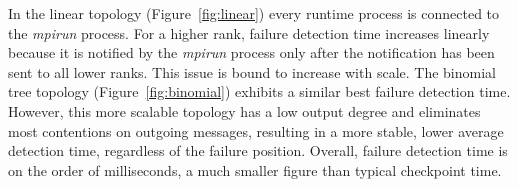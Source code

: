 In the linear topology (Figure~\ref{fig:linear}) every runtime process
is connected to the \emph{mpirun} process. For a higher rank, failure
detection time increases linearly because it is notified by the
\emph{mpirun} process only after the notification has been sent to all
lower ranks. This issue is bound to increase with scale. The binomial
tree topology (Figure~\ref{fig:binomial}) exhibits a similar best
failure detection time. However, this more scalable topology has a low
output degree and eliminates most contentions on outgoing messages,
resulting in a more stable, lower average detection time, regardless of the
failure position. Overall, failure detection time is on the order of
milliseconds, a much smaller figure than typical checkpoint time.



%

